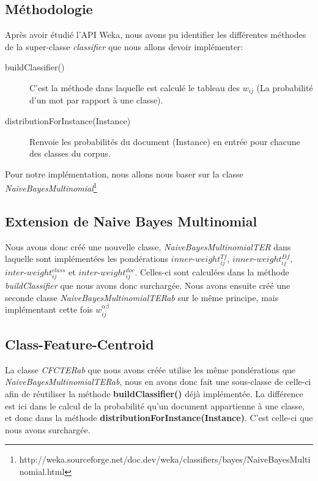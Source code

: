 \documentclass{article}
\begin{document}
\subsection{Méthodologie}
Après avoir étudié l'API Weka, nous avons pu identifier les différentes méthodes de la super-classe \textit{classifier} que nous allons devoir implémenter:
\begin{description}
\item[buildClassifier()]  C'est la méthode dans laquelle est calculé le tableau des $w_{ij}$ (La probabilité d'un mot par rapport à une classe).
\item[distributionForInstance(Instance)] Renvoie les probabilités du document (Instance) en entrée pour chacune des classes du corpus.
\end{description}
 Pour notre implémentation, nous allons nous baser sur la classe \textit{NaiveBayesMultinomial}\footnote{http://weka.sourceforge.net/doc.dev/weka/classifiers/bayes/NaiveBayesMultinomial.html}
\subsection{Extension de Naive Bayes Multinomial}
Nous avons donc créé une nouvelle classe, \textit{NaiveBayesMultinomialTER} dans laquelle sont implémentées les pondérations $inner$-$weight_{ij}^{Tf}$, $inner$-$weight_{ij}^{Df}$, $inter$-$weight_{ij}^{class}$ et $inter$-$weight_{ij}^{doc}$. Celles-ci sont calculées dans la méthode \textit{buildClassifier} que nous avons donc surchargée.
\medskip
Nous avons ensuite créé une seconde classe \textit{NaiveBayesMultinomialTERab} sur le même principe, mais implémentant cette fois $w_{ij}^{\alpha \beta}$
\subsection{Class-Feature-Centroid}
La classe \textit{CFCTERab} que nous avons créée utilise les même pondérations que \textit{NaiveBayesMultinomialTERab}, nous en avons donc fait une sous-classe de celle-ci afin de réutiliser la méthode \textbf{buildClassifier()} déjà implémentée. La différence est ici dans le calcul de la probabilité qu'un document appartienne à une classe, et donc dans la méthode \textbf{distributionForInstance(Instance)}. C'est celle-ci que nous avons surchargée.
\end{document}
